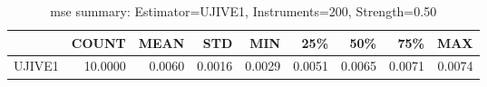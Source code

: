 \begin{table}[ht]
\centering
\caption{mse summary: Estimator=UJIVE1, Instruments=200, Strength=0.50}
\begin{tabular}{lrrrrrrrr}
\toprule
 & COUNT & MEAN & STD & MIN & 25\% & 50\% & 75\% & MAX \\
\midrule
UJIVE1 & 10.0000 & 0.0060 & 0.0016 & 0.0029 & 0.0051 & 0.0065 & 0.0071 & 0.0074 \\
\bottomrule
\end{tabular}
\end{table}
